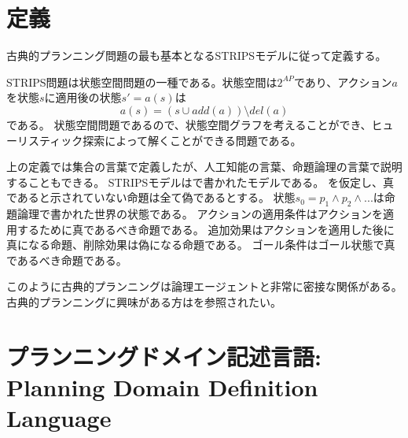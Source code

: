 \section{定義}
\label{sec:planning-definition}

古典的プランニング問題の最も基本となるSTRIPSモデル\cite{fikes:71}に従って定義する。


STRIPS問題は状態空間問題の一種である。状態空間は$2^{AP}$であり、アクション$a$を状態$s$に適用後の状態$s' = a(s)$は
\begin{equation}
	a(s) = (s \cup add(a)) \setminus del(a)
\end{equation}
である。
状態空間問題であるので、状態空間グラフを考えることができ、ヒューリスティック探索によって解くことができる問題である。

上の定義では集合の言葉で定義したが、人工知能の言葉、命題論理の言葉で説明することもできる。
STRIPSモデルはで書かれたモデルである。
を仮定し、真であると示されていない命題は全て偽であるとする。
状態$s_0 = p_1 \land p_2 \land ...$は命題論理で書かれた世界の状態である。
アクションの適用条件はアクションを適用するために真であるべき命題である。
追加効果はアクションを適用した後に真になる命題、削除効果は偽になる命題である。
ゴール条件はゴール状態で真であるべき命題である。

このように古典的プランニングは論理エージェントと非常に密接な関係がある。
古典的プランニングに興味がある方は\cite{russelln03}を参照されたい。


\section{プランニングドメイン記述言語:　Planning Domain Definition Language}
\label{sec:pddl}

